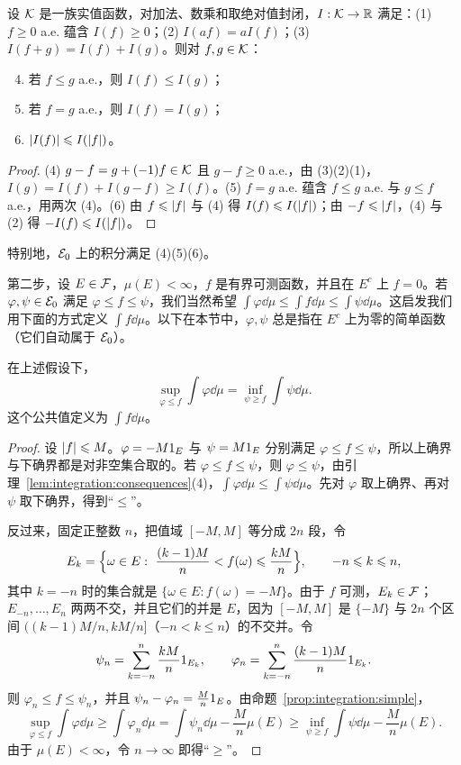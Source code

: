 \begin{lemma}\label{lem:integration:consequences}
设 $\mathcal{K}$ 是一族实值函数，对加法、数乘和取绝对值封闭，$I:\mathcal{K}\to\mathbb{R}$ 满足：(1) $f\geqslant0$ a.e. 蕴含 $I(f)\geqslant0$；(2) $I(af)=aI(f)$；(3) $I(f+g)=I(f)+I(g)$。则对 $f,g\in\mathcal{K}$：
\begin{enumerate}
\setcounter{enumi}{3}
\item 若 $f\leqslant g$ a.e.，则 $I(f)\leqslant I(g)$；
\item 若 $f=g$ a.e.，则 $I(f)=I(g)$；
\item $\lvert I(f)\rvert\leqslant I(\lvert f\rvert)$。
\end{enumerate}
\end{lemma}
\begin{proof}
(4) $g-f=g+(-1)f\in\mathcal{K}$ 且 $g-f\geqslant0$ a.e.，由 (3)(2)(1)，$I(g)=I(f)+I(g-f)\geqslant I(f)$。(5) $f=g$ a.e. 蕴含 $f\leqslant g$ a.e. 与 $g\leqslant f$ a.e.，用两次 (4)。(6) 由 $f\leqslant\lvert f\rvert$ 与 (4) 得 $I(f)\leqslant I(\lvert f\rvert)$；由 $-f\leqslant\lvert f\rvert$，(4) 与 (2) 得 $-I(f)\leqslant I(\lvert f\rvert)$。
\end{proof}

特别地，$\mathcal{E}_0$ 上的积分满足 (4)(5)(6)。


第二步，设 $E\in\mathcal{F}$，$\mu(E)<\infty$，$f$ 是有界可测函数，并且在 $E^c$ 上 $f=0$。若 $\varphi,\psi\in\mathcal{E}_0$ 满足 $\varphi\leqslant f\leqslant\psi$，我们当然希望 $\int\varphi\dd\mu\leqslant\int f\dd\mu\leqslant\int\psi\dd\mu$。这启发我们用下面的方式定义 $\int f\dd\mu$。以下在本节中，$\varphi,\psi$ 总是指在 $E^c$ 上为零的简单函数（它们自动属于 $\mathcal{E}_0$）。

\begin{theorem}\label{thm:integration:bounded}
在上述假设下，
\[
\sup_{\varphi\leqslant f}\int\varphi\dd\mu=\inf_{\psi\geqslant f}\int\psi\dd\mu .
\]
这个公共值定义为 $\int f\dd\mu$。
\end{theorem}
\begin{proof}
设 $\lvert f\rvert\leqslant M$。$\varphi=-M1_E$ 与 $\psi=M1_E$ 分别满足 $\varphi\leqslant f\leqslant\psi$，所以上确界与下确界都是对非空集合取的。若 $\varphi\leqslant f\leqslant\psi$，则 $\varphi\leqslant\psi$，由引理~\ref{lem:integration:consequences}(4)，$\int\varphi\dd\mu\leqslant\int\psi\dd\mu$。先对 $\varphi$ 取上确界、再对 $\psi$ 取下确界，得到“$\leqslant$”。

反过来，固定正整数 $n$，把值域 $[-M,M]$ 等分成 $2n$ 段，令
\[
E_k=\Bigl\{\omega\in E:\ \frac{(k-1)M}n<f(\omega)\leqslant\frac{kM}n\Bigr\},\qquad -n\leqslant k\leqslant n,
\]
其中 $k=-n$ 时的集合就是 $\{\omega\in E: f(\omega)=-M\}$。由于 $f$ 可测，$E_k\in\mathcal{F}$；$E_{-n},\dots,E_n$ 两两不交，并且它们的并是 $E$，因为 $[-M,M]$ 是 $\{-M\}$ 与 $2n$ 个区间 $((k-1)M/n,kM/n]$（$-n<k\leqslant n$）的不交并。令
\[
\psi_n=\sum_{k=-n}^n\frac{kM}n1_{E_k},\qquad \varphi_n=\sum_{k=-n}^n\frac{(k-1)M}n1_{E_k}.
\]
则 $\varphi_n\leqslant f\leqslant\psi_n$，并且 $\psi_n-\varphi_n=\frac Mn1_E$。由命题~\ref{prop:integration:simple}，
\[
\sup_{\varphi\leqslant f}\int\varphi\dd\mu\geqslant\int\varphi_n\dd\mu=\int\psi_n\dd\mu-\frac Mn\mu(E)\geqslant\inf_{\psi\geqslant f}\int\psi\dd\mu-\frac Mn\mu(E).
\]
由于 $\mu(E)<\infty$，令 $n\to\infty$ 即得“$\geqslant$”。
\end{proof}

